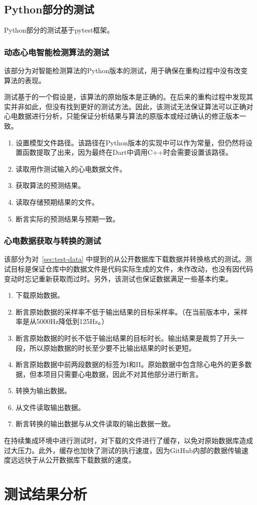\subsection{Python部分的测试}\label{subsec:test-python}

Python部分的测试基于pytest框架。

\subsubsection{动态心电智能检测算法的测试}

该部分为对智能检测算法的Python版本的测试，用于确保在重构过程中没有改变算法的表现。

测试基于的一个假设是，该算法的原始版本是正确的。在后来的重构过程中发现其实并非如此，但没有找到更好的测试方法。因此，该测试无法保证算法可以正确对心电数据进行分析，只能保证分析结果与算法的原版本或经过确认的修正版本一致。

\begin{enumerate}
    \item 设置模型文件路径。该路径在Python版本的实现中可以作为常量，但仍然将设置函数提取了出来，因为最终在Dart中调用C++时会需要设置该路径。
    \item 读取用作测试输入的心电数据文件。
    \item 获取算法的预测结果。
    \item 读取存储预期结果的文件。
    \item 断言实际的预测结果与预期一致。
\end{enumerate}

\subsubsection{心电数据获取与转换的测试}

该部分为对~\ref{sec:test-data} 中提到的从公开数据库下载数据并转换格式的测试。测试目标是保证仓库中的数据文件是代码实际生成的文件，未作改动，也没有因代码变动时忘记重新获取而过时。另外，该测试也保证数据满足一些基本约束。

\begin{enumerate}
    \item 下载原始数据。
    \item 断言原始数据的采样率不低于输出结果的目标采样率。（在当前版本中，采样率是从5000Hz降低到125Hz。）
    \item 断言原始数据的时长不低于输出结果的目标时长。输出结果是裁剪了开头一段，所以原始数据的时长至少要不比输出结果的时长更短。
    \item 断言原始数据中前两段数据的标签为I和II。原始数据中包含除心电外的更多数据，但本项目只需要心电数据，因此不对其他部分进行断言。
    \item 转换为输出数据。
    \item 从文件读取输出数据。
    \item 断言转换的输出数据与从文件读取的输出数据一致。
\end{enumerate}

在持续集成环境中进行测试时，对下载的文件进行了缓存，以免对原始数据库造成过大压力。此外，缓存也加快了测试的执行速度，因为GitHub内部的数据传输速度远远快于从公开数据库下载数据的速度。


\section{测试结果分析}\label{sec:test-result}

